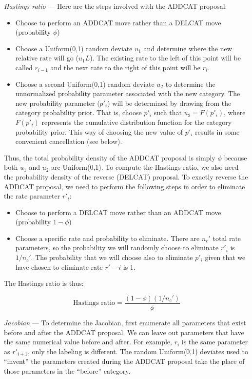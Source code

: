 \documentclass[12pt]{article}
\newcommand{\ncat}{n_c}
\begin{document}
{\em Hastings ratio} --- Here are the steps involved with the ADDCAT proposal:
\begin{itemize}
\item Choose to perform an ADDCAT move rather than a DELCAT move (probability $\phi$)
\item Choose a Uniform(0,1) random deviate $u_1$ and determine where the new relative rate will go ($u_1 L$). The existing rate to the left of this point will be called $r_{i-1}$ and the next rate to the right of this point will be $r_i$.
\item Choose a second Uniform(0,1) random deviate $u_2$ to determine the unnormalized probability parameter associated with the new category. The new probability parameter ($p'_i$) will be determined by drawing from the category probability prior. That is, choose $p'_i$ such that $u_2 = F(p'_i)$, where $F(p'_i)$ represents the cumulative distribution function for the category probability prior. This way of choosing the new value of $p'_i$ results in some convenient cancellation (see below).
\end{itemize}

Thus, the total probability density of the ADDCAT proposal is simply $\phi$ because both $u_1$ and $u_2$ are Uniform(0,1). To compute the Hastings ratio, we also need the probability density of the reverse (DELCAT) proposal. To exactly reverse the ADDCAT proposal, we need to perform the following steps in order to eliminate the rate parameter $r'_i$:

\begin{itemize}
\item Choose to perform a DELCAT move rather than an ADDCAT move (probability $1-\phi$)
\item Choose a specific rate and probability to eliminate. There are $\ncat'$ total rate parameters, so the probability we will randomly choose to eliminate $r'_i$ is $1/\ncat'$. The probability that we will choose also to eliminate $p'_i$ given that we have chosen to eliminate rate $r'-i$ is 1.
\end{itemize}

The Hastings ratio is thus:

\[ \mbox{Hastings ratio} = \frac{(1-\phi)(1/\ncat')}{\phi} \]

{\em Jacobian} --- To determine the Jacobian, first enumerate all parameters that exist before and after the ADDCAT proposal. We can leave out parameters that have the same numerical value before and after. For example, $r_{i}$ is the same parameter as $r'_{i+1}$, only the labeling is different. The random Uniform(0,1) deviates used to ``invent'' the parameters created during the ADDCAT proposal take the place of those parameters in the ``before'' category.
\end{document}
